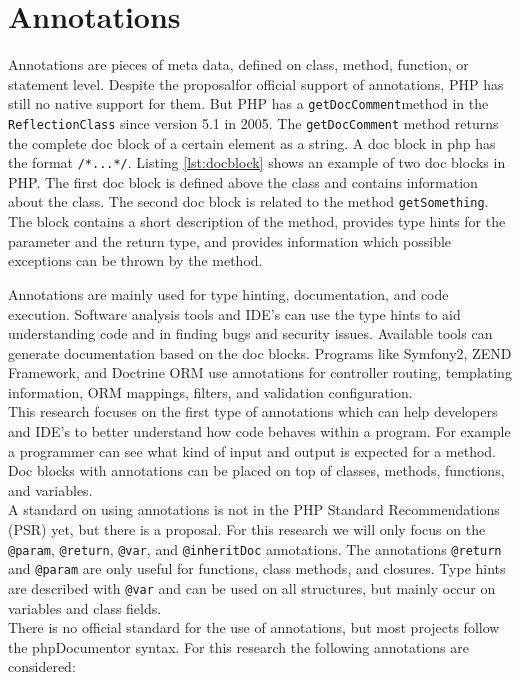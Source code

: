 \documentclass[../main.tex]{subfiles}
\begin{document}
        \section{Annotations}\label{sec:design_annotations}
    Annotations are pieces of meta data, defined on class, method, function, or statement level.
    Despite the proposal\footnotemark for official support of annotations, PHP has still no native support for them.
    But PHP has a \texttt{getDocComment}\footnotemark method in the \texttt{ReflectionClass} since version 5.1 in 2005.
    The \texttt{getDocComment} method returns the complete doc block of a certain element as a string.
    A doc block in php has the format \texttt{\slash**...*\slash}.
    Listing \ref{lst:docblock} shows an example of two doc blocks in PHP.
    The first doc block is defined above the class and contains information about the class.
    The second doc block is related to the method \texttt{getSomething}.
    The block contains a short description of the method, provides type hints for the parameter and the return type, and provides information which possible exceptions can be thrown by the method.

    

    Annotations are mainly used for type hinting, documentation, and code execution.
    Software analysis tools and IDE's can use the type hints to aid understanding code and in finding bugs and security issues.
    Available tools can generate documentation based on the doc blocks.
    Programs like Symfony2, ZEND Framework, and Doctrine ORM use annotations for controller routing, templating information, ORM mappings, filters, and validation configuration.
    \\
    This research focuses on the first type of annotations which can help developers and IDE's to better understand how code behaves within a program.
    For example a programmer can see what kind of input and output is expected for a method.
    Doc blocks with annotations can be placed on top of classes, methods, functions, and variables.
    \\
    A standard on using annotations is not in the PHP Standard Recommendations (\gls{PSR}) yet, but there is a proposal\footnotemark.
    For this research we will only focus on the \texttt{@param}, \texttt{@return}, \texttt{@var}, and \texttt{@inheritDoc} annotations.
    The annotations \texttt{@return} and \texttt{@param} are only useful for functions, class methods, and closures.
    Type hints are described with \texttt{@var} and can be used on all structures, but mainly occur on variables and class fields.
    \\
    There is no official standard for the use of annotations, but most projects follow the phpDocumentor\footnotemark{} syntax.
    For this research the following annotations are considered:
\end{document}
